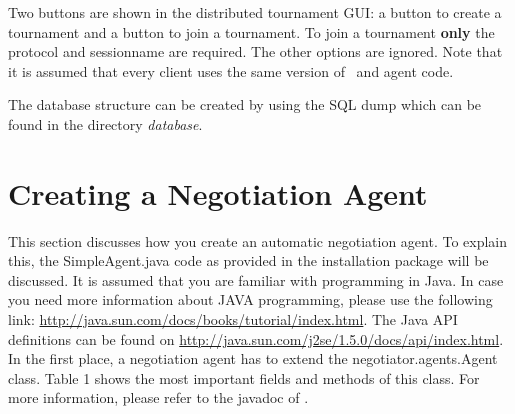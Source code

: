 \documentclass[]{article}
\begin{document}
Two buttons are shown in the distributed tournament GUI: a button to create a tournament and a button to join a tournament. To join a tournament \textbf{only} the protocol and sessionname are required. The other options are ignored. Note that it is assumed that every client uses the same version of \Genius~and agent code.

The database structure can be created by using the SQL dump which can be found in the directory \textit{database}. 






\section{Creating a Negotiation Agent}


This section discusses how you create an automatic negotiation agent. To explain this, the SimpleAgent.java code as provided in the installation package will be discussed.
It is assumed that you are familiar with programming in Java. In case you need more information about JAVA programming, please use the following link: \url{http://java.sun.com/docs/books/tutorial/index.html}. The Java API definitions can be found on \url{http://java.sun.com/j2se/1.5.0/docs/api/index.html}.
In the first place, a negotiation agent has to extend the negotiator.agents.Agent class. Table 1 shows the most important fields and methods of this class. For more information, please refer to the javadoc of \Genius.
\end{document}
